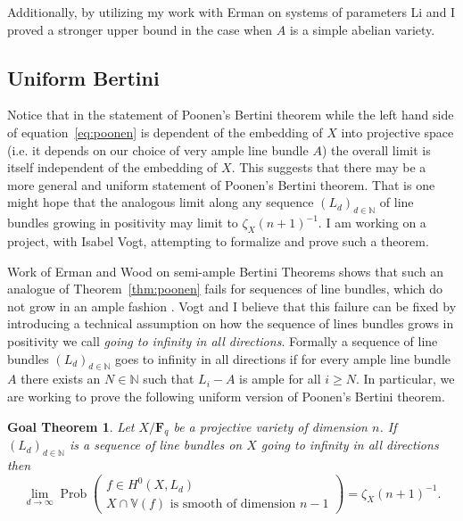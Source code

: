\documentclass[10pt,reqno]{amsart}
\newtheorem{goalTheorem}[lemma]{Goal Theorem}
\theoremstyle{remark}
\newcommand{\Prob}{\operatorname{Prob}}
\newcommand{\fF}{\mathbf F}
\newcommand{\N}{\mathbb{N}}
\newcommand{\V}{\mathbb{V}}
\begin{document}
Additionally, by utilizing my work with Erman on systems of parameters Li and I proved a stronger upper bound in the case when $A$ is a simple abelian variety. 

\subsection{Uniform Bertini}

Notice that in the statement of Poonen's Bertini theorem while the left hand side of equation~\eqref{eq:poonen} is dependent of the embedding of $X$ into projective space (i.e. it depends on our choice of very ample line bundle $A$) the overall limit is itself independent of the embedding of $X$. This suggests that there may be a more general and uniform statement of Poonen's Bertini theorem. That is one might hope that the analogous limit along any sequence $(L_{d})_{d\in\N}$ of line bundles growing in positivity may limit to $\zeta_{X}(n+1)^{-1}$. I am working on a project, with Isabel Vogt, attempting to formalize and prove such a theorem.

Work of Erman and Wood on semi-ample Bertini Theorems shows that such an analogue of Theorem~\ref{thm:poonen} fails for sequences of line bundles, which do not grow in an ample fashion \cite{ermanWood15}. Vogt and I believe that this failure can be fixed by introducing a technical assumption on how the sequence of lines bundles grows in positivity we call \textit{going to infinity in all directions}. Formally a sequence of line bundles  $\left(L_{d}\right)_{d\in\N}$ goes to infinity in all directions if for every ample line bundle $A$ there exists an $N\in \N$ such that $L_{i}-A$ is ample for all $i\geq N$. In particular, we are working to prove the following uniform version of Poonen's Bertini theorem.
 
\begin{goalTheorem}\label{gthm:effective-bertini}
Let $X/\fF_{q}$ be a projective variety of dimension $n$. If $\left(L_{d}\right)_{d\in\N}$ is a sequence of line bundles on $X$ going to infinity in all directions then 
\begin{equation}
\lim_{d\to \infty} \Prob\left(\begin{matrix} f\in H^0\left(X, L_{d}\right) \\ \text{$X\cap \V(f)$ is smooth of dimension $n-1$}\end{matrix}\right)=
\zeta_X(n+1)^{-1}.
\end{equation}
\end{goalTheorem}
\end{document}
